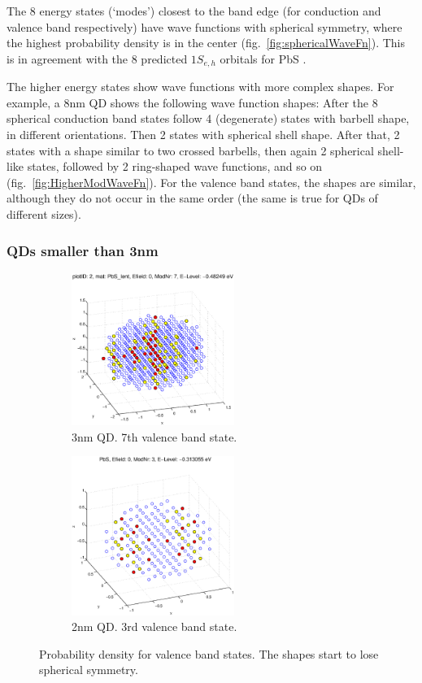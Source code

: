 The 8 energy states (`modes') closest to the band edge (for conduction and valence band respectively) have wave functions with spherical symmetry, where the highest probability density is in the center (fig.~\ref{fig:sphericalWaveFn}). This is in agreement with the 8 predicted $1S_{e,h}$ orbitals for PbS \cite[p.410]{Talapin}.
	
The higher energy states show wave functions with more complex shapes. For example, a 8nm QD shows the following wave function shapes: After the 8 spherical conduction band states follow 4 (degenerate) states with barbell shape, in different orientations. Then 2 states with spherical shell shape. After that, 2 states with a shape similar to two crossed barbells, then again 2 spherical shell-like states, followed by 2 ring-shaped wave functions, and so on (fig.~\ref{fig:HigherModWaveFn}). For the valence band states, the shapes are similar, although they do not occur in the same order (the same is true for QDs of different sizes).

\subsubsection{QDs smaller than 3nm}	

\begin{figure}
	\centering
	\begin{subfigure}{200px}
		\includegraphics[width=200px]{Fig/Plots/r15VBmod7}
		\caption{3nm QD. 7th valence band state.}
	\end{subfigure}
	\begin{subfigure}{200px}
		\includegraphics[width=200px]{Fig/Plots/r1VBmod3}
		\caption{2nm QD. 3rd valence band state.}
	\end{subfigure}
	\caption{Probability density for valence band states. The shapes start to lose spherical symmetry.}
	\label{fig:asymWaveFn}
\end{figure}


